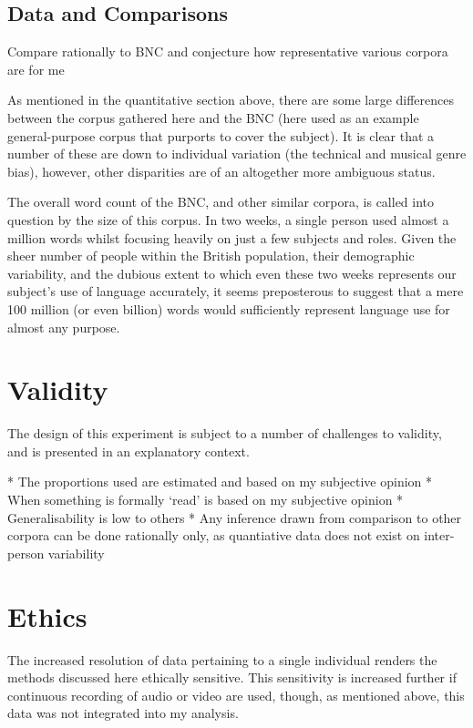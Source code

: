 \subsection{Data and Comparisons}
Compare rationally to BNC and conjecture how representative various corpora are for me

As mentioned in the quantitative section above, there are some large differences between the corpus gathered here and the BNC (here used as an example general-purpose corpus that purports to cover the subject).  It is clear that a number of these are down to individual variation (the technical and musical genre bias), however, other disparities are of an altogether more ambiguous status.

The overall word count of the BNC, and other similar corpora, is called into question by the size of this corpus.  In two weeks, a single person used almost a million words whilst focusing heavily on just a few subjects and roles.  Given the sheer number of people within the British population, their demographic variability, and the dubious extent to which even these two weeks represents our subject's use of language accurately, it seems preposterous to suggest that a mere 100 million (or even billion) words would sufficiently represent language use for almost any purpose.











\section{Validity}
The design of this experiment is subject to a number of challenges to validity, and is presented in an explanatory context.

* The proportions used are estimated and based on my subjective opinion
* When something is formally `read' is based on my subjective opinion
* Generalisability is low to others
* Any inference drawn from comparison to other corpora can be done rationally only, as quantiative data does not exist on inter-person variability



\section{Ethics}
The increased resolution of data pertaining to a single individual renders the methods discussed here ethically sensitive.  This sensitivity is increased further if continuous recording of audio or video are used, though, as mentioned above, this data was not integrated into my analysis.

